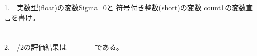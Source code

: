 \documentclass[a4j]{jarticle}
\begin{document}
\begin{multicols*}{2}
1.　実数型({\ttfamily float})の変数{\ttfamily Sigma\_0}と
符号付き整数({\ttfamily short})の変数
{\ttfamily count1}の変数宣言を書け。\\
\\
\\


2.　{/2}の評価結果は　　　　である。


%
















\end{multicols*}
\end{document}
